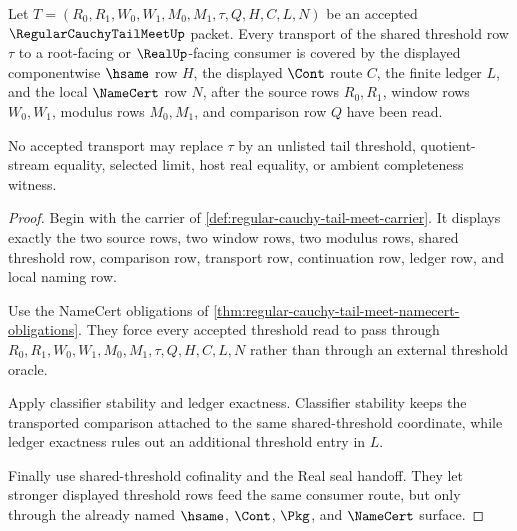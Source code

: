 \begin{theorem}
\label{thm:regular-cauchy-tail-meet-threshold-transport-coverage}
Let $T=(R_0,R_1,W_0,W_1,M_0,M_1,\tau,Q,H,C,L,N)$ be an accepted $\RegularCauchyTailMeetUp$ packet. Every transport of the shared threshold row $\tau$ to a root-facing or $\RealUp$-facing consumer is covered by the displayed componentwise $\hsame$ row $H$, the displayed $\Cont$ route $C$, the finite ledger $L$, and the local $\NameCert$ row $N$, after the source rows $R_0,R_1$, window rows $W_0,W_1$, modulus rows $M_0,M_1$, and comparison row $Q$ have been read.

No accepted transport may replace $\tau$ by an unlisted tail threshold, quotient-stream equality, selected limit, host real equality, or ambient completeness witness.
\end{theorem}
\begin{proof}
Begin with the carrier of \autoref{def:regular-cauchy-tail-meet-carrier}. It displays exactly the two source rows, two window rows, two modulus rows, shared threshold row, comparison row, transport row, continuation row, ledger row, and local naming row.

Use the NameCert obligations of \autoref{thm:regular-cauchy-tail-meet-namecert-obligations}. They force every accepted threshold read to pass through $R_0,R_1,W_0,W_1,M_0,M_1,\tau,Q,H,C,L,N$ rather than through an external threshold oracle.

Apply classifier stability and ledger exactness. Classifier stability keeps the transported comparison attached to the same shared-threshold coordinate, while ledger exactness rules out an additional threshold entry in $L$.

Finally use shared-threshold cofinality and the Real seal handoff. They let stronger displayed threshold rows feed the same consumer route, but only through the already named $\hsame$, $\Cont$, $\Pkg$, and $\NameCert$ surface.
\end{proof}

